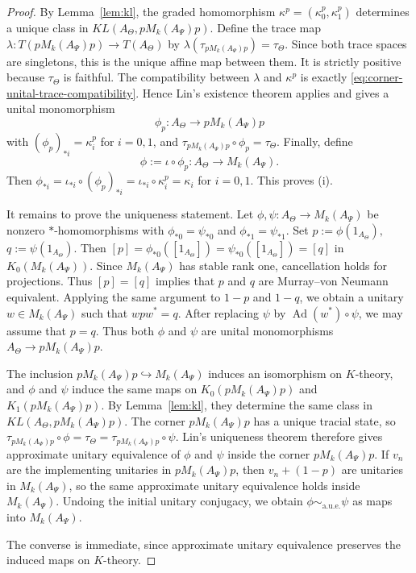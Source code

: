 \documentclass[11pt]{amsart}
\theoremstyle{definition}
\theoremstyle{remark}
\newcommand{\aue}{\sim_{\mathrm{a.u.e.}}}
\begin{document}
\begin{proof}
By Lemma~\ref{lem:kl}, the graded homomorphism $\kappa^p=(\kappa_0^p,\kappa_1^p)$
determines a unique class in $KL(A_\Theta,pM_k(A_{\Psi})p).$
Define the trace map $\lambda\colon T(pM_k(A_{\Psi})p)\to T(A_\Theta)$
by $\lambda(\tau_{pM_k(A_{\Psi})p})=\tau_\Theta.$ Since both trace spaces are singletons, this is the unique affine map between
them. It is strictly positive because $\tau_\Theta$ is faithful. 
The compatibility between $\lambda$ and $\kappa^p$ is exactly
\eqref{eq:corner-unital-trace-compatibility}. Hence Lin's existence theorem \cite[Theorem~5.2]{LinRange} applies and gives a unital monomorphism
\[
\phi_p\colon A_\Theta\to pM_k(A_{\Psi})p
\]
with $(\phi_p)_{*i}=\kappa_i^p$ for $i=0,1$,
and $\tau_{pM_k(A_{\Psi})p}\circ\phi_p=\tau_\Theta.$ Finally, define
\[
\phi:=\iota\circ\phi_p\colon A_\Theta\to M_k(A_\Psi).
\]
Then $\phi_{*i}
=
\iota_{*i}\circ(\phi_p)_{*i}
=
\iota_{*i}\circ\kappa_i^p
=
\kappa_i$
for $i=0,1$. This proves \textup{(i)}.

It remains to prove the uniqueness statement. Let $\phi,\psi\colon A_\Theta\to M_k(A_\Psi)$
be nonzero $*$-homomorphisms with $\phi_{*0}=\psi_{*0}$ and $\phi_{*1}=\psi_{*1}.$ Set $p:=\phi(1_{A_\Theta}),$ 
$q:=\psi(1_{A_\Theta}).$
Then $[p]=\phi_{*0}([1_{A_\Theta}])=\psi_{*0}([1_{A_\Theta}])=[q]$
in $K_0(M_k(A_\Psi))$. Since $M_k(A_\Psi)$ has stable rank one, cancellation holds for projections.
Thus $[p]=[q]$ implies that $p$ and $q$ are Murray--von Neumann
equivalent. Applying the same argument to $1-p$ and $1-q$, we obtain a
unitary $w\in M_k(A_\Psi)$ such that $wpw^*=q.$
After replacing $\psi$ by $\operatorname{Ad}(w^*)\circ\psi$, we may assume
that $p=q$. Thus both $\phi$ and $\psi$ are unital monomorphisms $A_\Theta\to pM_k(A_\Psi)p.$

The inclusion $pM_k(A_\Psi)p\hookrightarrow M_k(A_\Psi)$ induces an isomorphism on $K$-theory, and $\phi$ and $\psi$ induce the same maps on $K_0(pM_k(A_\Psi)p)$ and $K_1(pM_k(A_\Psi)p)$. By Lemma~\ref{lem:kl}, they determine the same class in $KL(A_\Theta,pM_k(A_\Psi)p).$
The corner $pM_k(A_\Psi)p$ has a unique tracial state, so $\tau_{pM_k(A_\Psi)p}\circ\phi=\tau_\Theta=\tau_{pM_k(A_\Psi)p}\circ\psi.$
Lin's uniqueness theorem therefore gives approximate unitary equivalence of $\phi$ and $\psi$ inside the corner $pM_k(A_\Psi)p$. If $v_n$ are the implementing unitaries in $pM_k(A_\Psi)p$, then $v_n+(1-p)$
are unitaries in $M_k(A_\Psi)$, so the same approximate unitary equivalence holds inside $M_k(A_\Psi)$. Undoing the initial unitary conjugacy, we obtain $\phi\aue\psi$
as maps into $M_k(A_\Psi)$.

The converse is immediate, since approximate unitary equivalence preserves the induced maps on $K$-theory.
\end{proof}
\end{document}
